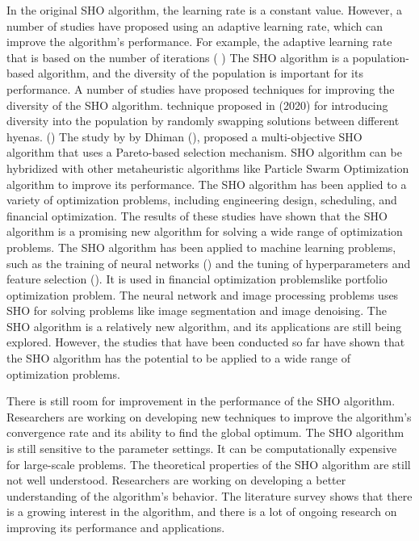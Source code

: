 \documentclass[12pt]{article}
\begin{document}
In the original SHO algorithm, the learning rate is a constant value. However, a number of studies have proposed using an adaptive learning rate, which can improve the algorithm's performance. For example, the adaptive learning rate that is based on the number of iterations ( \cite{ghafori2021advances}) The SHO algorithm is a population-based algorithm, and the diversity of the population is important for its performance. A number of studies have proposed techniques for improving the diversity of the SHO algorithm. technique proposed in (2020) for introducing diversity into the population by randomly swapping solutions between different hyenas. (\cite{kumar2020binary,dhiman2019spotted}) The study by by Dhiman (\cite{dhiman2017spotted,dhiman2018multi}), proposed a multi-objective SHO algorithm that uses a Pareto-based selection mechanism. SHO algorithm can be hybridized with other metaheuristic algorithms like Particle Swarm Optimization algorithm to improve its performance. The SHO algorithm has been applied to a variety of optimization problems, including engineering design, scheduling, and financial optimization. The results of these studies have shown that the SHO algorithm is a promising new algorithm for solving a wide range of optimization problems.
 The SHO algorithm has been applied to machine learning problems, such as the training of neural networks (\cite{ghafori2021advances,ewees2021new}) and the tuning of hyperparameters and feature selection (\cite{kumar2020binary,luo2021using}). It is used in financial optimization problemslike portfolio optimization problem. The neural network and image processing problems uses SHO for solving problems like image segmentation and image denoising. The SHO algorithm is a relatively new algorithm, and its applications are still being explored. However, the studies that have been conducted so far have shown that the SHO algorithm has the potential to be applied to a wide range of optimization problems.

 There is still room for improvement in the performance of the SHO algorithm. Researchers are working on developing new techniques to improve the algorithm's convergence rate and its ability to find the global optimum. 
 The SHO algorithm is still sensitive to the parameter settings. It can be computationally expensive for large-scale problems. 
 The theoretical properties of the SHO algorithm are still not well understood. Researchers are working on developing a better understanding of the algorithm's behavior. The literature survey shows that there is a growing interest in the algorithm, and there is a lot of ongoing research on improving its performance and applications.
\end{document}
